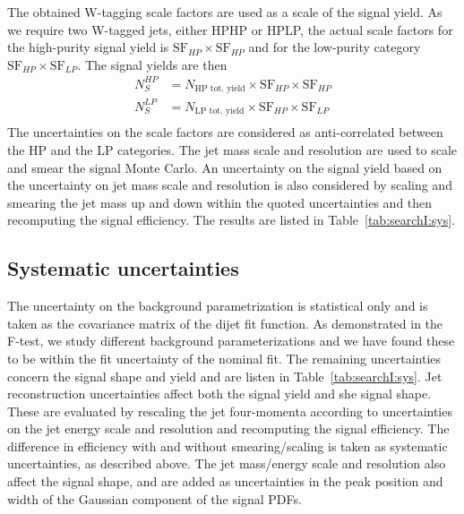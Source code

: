 The obtained W-tagging scale factors are used as a scale of the signal yield. As we require two W-tagged jets, either HPHP or HPLP, the actual scale factors for the high-purity signal yield is $\textrm{SF}_{HP}\times\textrm{SF}_{HP}$ and for the low-purity category $\textrm{SF}_{HP}\times\textrm{SF}_{LP}$. The signal yields are then
\begin{align*}
N_{S}^{HP} &= N_{\textrm{HP tot. yield}} \times \textrm{SF}_{HP} \times \textrm{SF}_{HP}\\
N_{S}^{LP} &= N_{\textrm{LP tot. yield}} \times \textrm{SF}_{HP} \times \textrm{SF}_{LP}\\
\end{align*}
The uncertainties on the scale factors are considered as anti-correlated between the HP and the LP categories.
The jet mass scale and resolution are used to scale and smear the signal Monte Carlo. An uncertainty on the signal yield based on the uncertainty on jet mass scale and resolution is also considered by scaling and smearing the jet mass up and down within the quoted uncertainties and then recomputing the signal efficiency. The results are listed in Table~\ref{tab:searchI:sys}.
  
\subsection{Systematic uncertainties}
\label{sec:searchI:sys}

The uncertainty on the background parametrization is statistical only and is taken as the covariance matrix of the dijet fit function. As demonstrated in the F-test, we study different background parameterizations and we have found these to be within the fit uncertainty of the nominal fit. The remaining uncertainties concern the signal shape and yield and are listen in Table~\ref{tab:searchI:sys}. Jet reconstruction uncertainties affect both the signal yield and she signal shape. These are evaluated by rescaling the jet four-momenta according to uncertainties on the jet energy scale and resolution and recomputing the signal efficiency. The difference in efficiency with and without smearing/scaling is taken as systematic uncertainties, as described above.
The jet mass/energy scale and resolution also affect the signal shape, and are added as uncertainties in the peak position and width of the Gaussian component of the signal PDFs.

